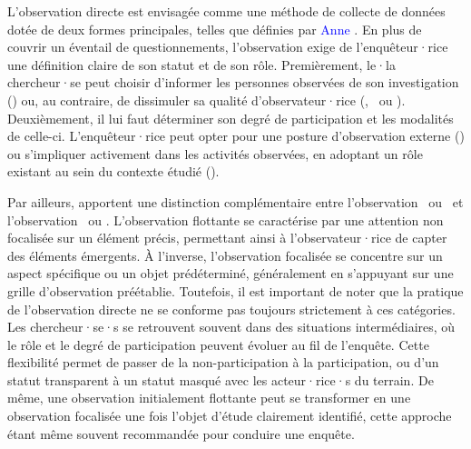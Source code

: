 \begin{refsegment}
L'observation directe est envisagée comme une méthode de collecte de données dotée de deux formes principales, telles que définies par \textcolor{blue}{Anne} \textcolor{blue}{\textcite[17, 21]{revillard_observation_2018}}. En plus de couvrir un éventail de questionnements, l'observation exige de l'enquêteur·rice une définition claire de son statut et de son rôle. Premièrement, le·la chercheur·se peut choisir d'informer les personnes observées de son investigation () ou, au contraire, de dissimuler sa qualité d'observateur·rice (, ~ou ). Deuxièmement, il lui faut déterminer son degré de participation et les modalités de celle-ci. L'enquêteur·rice peut opter pour une posture d'observation externe () ou s'impliquer activement dans les activités observées, en adoptant un rôle existant au sein du contexte étudié ().%

Par ailleurs, \textcolor{blue}{\textcite[16-19]{corbille_espace_2020}} apportent une distinction complémentaire entre l'observation ~ou ~et l'observation ~ou . L'observation flottante se caractérise par une attention non focalisée sur un élément précis, permettant ainsi à l'observateur·rice de capter des éléments émergents. À l'inverse, l'observation focalisée se concentre sur un aspect spécifique ou un objet prédéterminé, généralement en s'appuyant sur une grille d'observation préétablie. Toutefois, il est important de noter que la pratique de l'observation directe ne se conforme pas toujours strictement à ces catégories. Les chercheur·se·s se retrouvent souvent dans des situations intermédiaires, où le rôle et le degré de participation peuvent évoluer au fil de l'enquête. Cette flexibilité permet de passer de la non-participation à la participation, ou d'un statut transparent à un statut masqué avec les acteur·rice·s du terrain. De même, une observation initialement flottante peut se transformer en une observation focalisée une fois l'objet d'étude clairement identifié, cette approche étant même souvent recommandée pour conduire une enquête.%


\end{refsegment}

